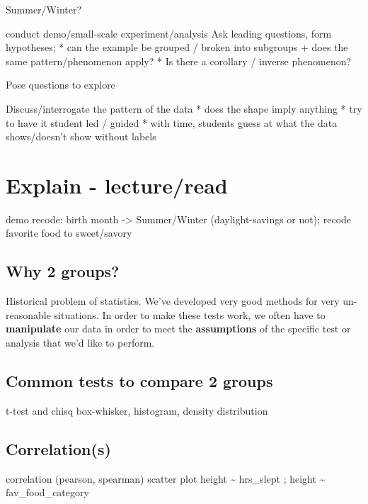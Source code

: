 \documentclass[
]{book}
\begin{document}
Summer/Winter?

conduct demo/small-scale experiment/analysis
Ask leading questions, form hypotheses;
* can the example be grouped / broken into subgroups
+ does the same pattern/phenomenon apply?
* Is there a corollary / inverse phenomenon?

Pose questions to explore

Discuss/interrogate the pattern of the data
* does the shape imply anything
* try to have it student led / guided
* with time, students guess at what the data shows/doesn't show without labels

\hypertarget{explain---lectureread-1}{%
\section{Explain - lecture/read}\label{explain---lectureread-1}}

demo recode: birth month -\textgreater{} Summer/Winter (daylight-savings or not);
recode favorite food to sweet/savory

\hypertarget{why-2-groups}{%
\subsection{Why 2 groups?}\label{why-2-groups}}

Historical problem of statistics. We've developed very good methods for very un-reasonable
situations. In order to make these tests work, we often have to \textbf{manipulate}
our data in order to meet the \textbf{assumptions} of the specific test or analysis
that we'd like to perform.

\hypertarget{common-tests-to-compare-2-groups}{%
\subsection{Common tests to compare 2 groups}\label{common-tests-to-compare-2-groups}}

t-test and chisq \textbar{} box-whisker, histogram, density distribution

\hypertarget{correlations}{%
\subsection{Correlation(s)}\label{correlations}}

correlation (pearson, spearman) \textbar{} scatter plot
height \textasciitilde{} hrs\_slept ; height \textasciitilde{} fav\_food\_category
\end{document}

